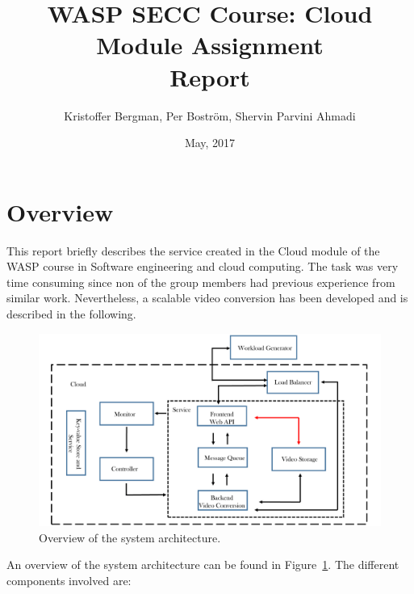\documentclass[a4paper, 10pt, english]{article}
\title{WASP SECC Course: Cloud Module Assignment\\Report}
\author{Kristoffer Bergman, Per Boström, Shervin Parvini Ahmadi}
\date{May, 2017}
\begin{document}
\maketitle

\section{Overview}
This report briefly describes the service created in the Cloud module of the WASP course in Software engineering and cloud computing. 
The task was very time consuming since non of the group members had previous experience from similar work. Nevertheless, a scalable video conversion has been developed and is described in the following.

\begin{figure}
	\label{fig:architecture}
	\centering
	\includegraphics[width=1\textwidth]{figs/workflow.pdf}
	\caption{Overview of the system architecture.}
\end{figure}
An overview of the system architecture can be found in Figure~\ref{fig:architecture}. The different components involved are:
\end{document}
